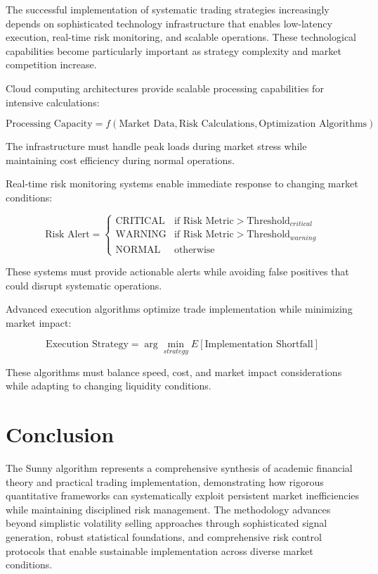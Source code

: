 \documentclass[
  american,
  11pt,
  11pt,
  letterpaper,
  onecolumn]{article}
\begin{document}
The successful implementation of systematic trading strategies
increasingly depends on sophisticated technology infrastructure that
enables low-latency execution, real-time risk monitoring, and scalable
operations. These technological capabilities become particularly
important as strategy complexity and market competition increase.

Cloud computing architectures provide scalable processing capabilities
for intensive calculations:

\[\text{Processing Capacity} = f(\text{Market Data}, \text{Risk Calculations}, \text{Optimization Algorithms})\]

The infrastructure must handle peak loads during market stress while
maintaining cost efficiency during normal operations.

Real-time risk monitoring systems enable immediate response to changing
market conditions:

\[\text{Risk Alert} = \begin{cases}
\text{CRITICAL} & \text{if Risk Metric} > \text{Threshold}_{critical} \\
\text{WARNING} & \text{if Risk Metric} > \text{Threshold}_{warning} \\
\text{NORMAL} & \text{otherwise}
\end{cases}\]

These systems must provide actionable alerts while avoiding false
positives that could disrupt systematic operations.

Advanced execution algorithms optimize trade implementation while
minimizing market impact:

\[\text{Execution Strategy} = \arg\min_{strategy} E[\text{Implementation Shortfall}]\]

These algorithms must balance speed, cost, and market impact
considerations while adapting to changing liquidity conditions.

\section{Conclusion}\label{conclusion}

The Sunny algorithm represents a comprehensive synthesis of academic
financial theory and practical trading implementation, demonstrating how
rigorous quantitative frameworks can systematically exploit persistent
market inefficiencies while maintaining disciplined risk management. The
methodology advances beyond simplistic volatility selling approaches
through sophisticated signal generation, robust statistical foundations,
and comprehensive risk control protocols that enable sustainable
implementation across diverse market conditions.
\end{document}

